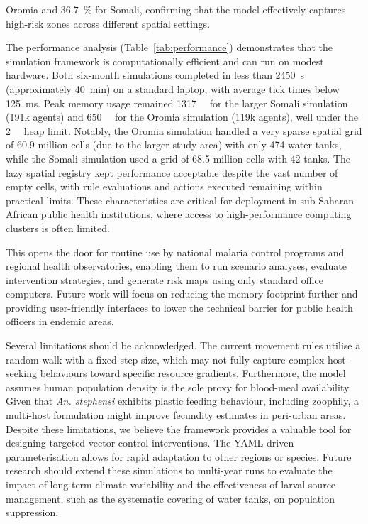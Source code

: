 \documentclass{article}
\begin{document}
Oromia and \qty{36.7}{\percent} for Somali, confirming that the model effectively captures high-risk zones across different 
spatial settings.
\par
The performance analysis (Table~\ref{tab:performance}) demonstrates that the simulation framework is computationally efficient 
and can run on modest hardware. Both six-month simulations completed in less than \qty{2450}{\second} (approximately \qty{40}{\minute}) 
on a standard laptop, with average tick times below \qty{125}{\milli\second}. Peak memory usage remained \qty{1317}{\mega\byte} 
for the larger Somali simulation (\num{191}k agents) and \qty{650}{\mega\byte} for the Oromia simulation (\num{119}k agents), 
well under the \qty{2}{\giga\byte} heap limit. Notably, the Oromia simulation handled a very sparse spatial grid of \num{60.9} 
million cells (due to the larger study area) with only \num{474} water tanks, while the Somali simulation used a grid of \num{68.5} 
million cells with \num{42} tanks. The lazy spatial registry kept performance acceptable despite the vast number of empty cells, with 
rule evaluations and actions executed remaining within practical limits. These characteristics are critical for deployment in sub-Saharan 
African public health institutions, where access to high-performance computing clusters is often limited.
\par
This opens the door for routine use by national malaria control programs and regional health observatories, enabling them to run 
scenario analyses, evaluate intervention strategies, and generate risk maps using only standard office computers. Future work will 
focus on reducing the memory footprint further and providing user-friendly interfaces to lower the technical barrier for public health 
officers in endemic areas.
\par
Several limitations should be acknowledged. The current movement rules utilise a random walk with a fixed step size, which may not 
fully capture complex host-seeking behaviours toward specific resource gradients. Furthermore, the model assumes human population density 
is the sole proxy for blood-meal availability. Given that \textit{An. stephensi} exhibits plastic feeding behaviour, including zoophily, 
a multi-host formulation might improve fecundity estimates in peri-urban areas. Despite these limitations, we believe the framework 
provides a valuable tool for designing targeted vector control interventions. The YAML-driven parameterisation allows for rapid 
adaptation to other regions or species. Future research should extend these simulations to multi-year runs to evaluate the impact 
of long-term climate variability and the effectiveness of larval source management, such as the systematic covering of water tanks, 
on population suppression.
\end{document}
